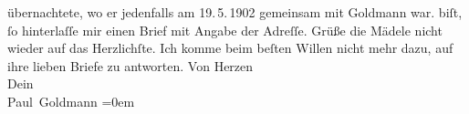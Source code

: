 \begin{ledgroupsized}[t]{13cm}
{{{                  übernachtete, wo er jedenfalls am 19. 5. 1902 gemeinsam mit Goldmann war.}}}\label{K_L03209-4h} biſt, ſo hinterlaſſe mir einen Brief
               mit Angabe der Adreſſe. Grüße die Mädele nicht wieder auf das Herzlichſte. Ich komme
               beim beſten Willen nicht mehr dazu, auf ihre lieben Briefe zu antworten.\pend
           \pstart
           Von Herzen {\\[\baselineskip]}Dein {\\[\baselineskip]}\spacefill\mbox{Paul Goldmann}\pend
           \leftskip=0em{}
         
         \endnumbering{}\end{ledgroupsized}\begin{anhang}\end{anhang}\newcommand{\dateiname}{L03209}\newcommand{\titel}{Paul Goldmann an Arthur Schnitzler, 16. 5. [1902]}\newcommand{\editorInnen}{Martin Anton Müller und Laura Untner}
      